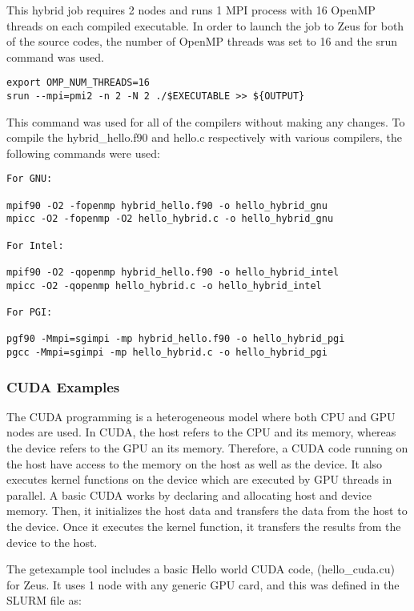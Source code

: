 \documentclass[journal]{IEEEtran}
\begin{document}
This hybrid job requires 2 nodes and runs 1 MPI process with 16 OpenMP threads on each compiled executable. In order to launch the job to Zeus for both 
of the source codes, the number of OpenMP threads was set to 16 and the srun command was used.

\begin{verbatim}
export OMP_NUM_THREADS=16
srun --mpi=pmi2 -n 2 -N 2 ./$EXECUTABLE >> ${OUTPUT}
\end{verbatim}

This command was used for all of the compilers without making any changes. To compile the hybrid_hello.f90 and hello.c respectively with various 
compilers, the following commands were used:

\begin{verbatim}
For GNU:

mpif90 -O2 -fopenmp hybrid_hello.f90 -o hello_hybrid_gnu
mpicc -O2 -fopenmp -O2 hello_hybrid.c -o hello_hybrid_gnu

For Intel:

mpif90 -O2 -qopenmp hybrid_hello.f90 -o hello_hybrid_intel
mpicc -O2 -qopenmp hello_hybrid.c -o hello_hybrid_intel

For PGI:

pgf90 -Mmpi=sgimpi -mp hybrid_hello.f90 -o hello_hybrid_pgi
pgcc -Mmpi=sgimpi -mp hello_hybrid.c -o hello_hybrid_pgi
\end{verbatim}

\subsubsection{CUDA Examples}

The CUDA programming is a heterogeneous model where both CPU and GPU nodes are used. In CUDA, the host refers to the CPU and its memory, whereas the 
device refers to the GPU an its memory. Therefore, a CUDA code running on the host have access to the memory on the host as well as the device. It also 
executes kernel functions on the device which are executed by GPU threads in parallel. A basic CUDA works by declaring and allocating host and device 
memory. Then, it initializes the host data and transfers the data from the host to the device. Once it executes the kernel function, it transfers the 
results from the device to the host.

The getexample tool includes a basic Hello world CUDA code, (hello_cuda.cu) for Zeus. It uses 1 node with any generic GPU card, and this was defined in the 
SLURM file as:
\end{document}
